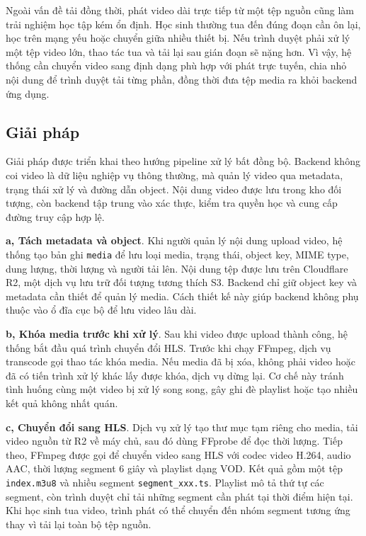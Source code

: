 \documentclass[../DoAn.tex]{subfiles}
\begin{document}
Ngoài vấn đề tải đồng thời, phát video dài trực tiếp từ một tệp nguồn cũng làm trải nghiệm học tập kém ổn định. Học sinh thường tua đến đúng đoạn cần ôn lại, học trên mạng yếu hoặc chuyển giữa nhiều thiết bị. Nếu trình duyệt phải xử lý một tệp video lớn, thao tác tua và tải lại sau gián đoạn sẽ nặng hơn. Vì vậy, hệ thống cần chuyển video sang định dạng phù hợp với phát trực tuyến, chia nhỏ nội dung để trình duyệt tải từng phần, đồng thời đưa tệp media ra khỏi backend ứng dụng.

\subsection{Giải pháp}
\label{section:5.3.2}

Giải pháp được triển khai theo hướng pipeline xử lý bất đồng bộ. Backend không coi video là dữ liệu nghiệp vụ thông thường, mà quản lý video qua metadata, trạng thái xử lý và đường dẫn object. Nội dung video được lưu trong kho đối tượng, còn backend tập trung vào xác thực, kiểm tra quyền học và cung cấp đường truy cập hợp lệ.

\textbf{a, Tách metadata và object}. Khi người quản lý nội dung upload video, hệ thống tạo bản ghi \texttt{media} để lưu loại media, trạng thái, object key, MIME type, dung lượng, thời lượng và người tải lên. Nội dung tệp được lưu trên Cloudflare R2, một dịch vụ lưu trữ đối tượng tương thích S3. Backend chỉ giữ object key và metadata cần thiết để quản lý media. Cách thiết kế này giúp backend không phụ thuộc vào ổ đĩa cục bộ để lưu video lâu dài.

\textbf{b, Khóa media trước khi xử lý}. Sau khi video được upload thành công, hệ thống bắt đầu quá trình chuyển đổi HLS. Trước khi chạy FFmpeg, dịch vụ transcode gọi thao tác khóa media. Nếu media đã bị xóa, không phải video hoặc đã có tiến trình xử lý khác lấy được khóa, dịch vụ dừng lại. Cơ chế này tránh tình huống cùng một video bị xử lý song song, gây ghi đè playlist hoặc tạo nhiều kết quả không nhất quán.

\textbf{c, Chuyển đổi sang HLS}. Dịch vụ xử lý tạo thư mục tạm riêng cho media, tải video nguồn từ R2 về máy chủ, sau đó dùng FFprobe để đọc thời lượng. Tiếp theo, FFmpeg được gọi để chuyển video sang HLS với codec video H.264, audio AAC, thời lượng segment 6 giây và playlist dạng VOD. Kết quả gồm một tệp \texttt{index.m3u8} và nhiều segment \texttt{segment\_xxx.ts}. Playlist mô tả thứ tự các segment, còn trình duyệt chỉ tải những segment cần phát tại thời điểm hiện tại. Khi học sinh tua video, trình phát có thể chuyển đến nhóm segment tương ứng thay vì tải lại toàn bộ tệp nguồn.
\end{document}
